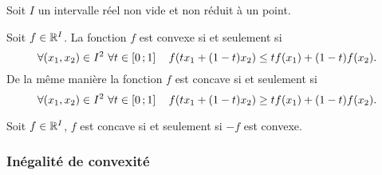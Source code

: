 Soit $I$ un intervalle réel non vide et non réduit à un point.

\begin{defdef}
  Soit $f \in \mathbb{R}^I$. La fonction $f$ est convexe si et seulement si
  \begin{equation}
    \forall (x_1, x_2) \in I^2 \ \forall t \in \left[ 0 \, ;  1 \right] \quad f(tx_1+(1-t)x_2) \leq tf(x_1)+(1-t)f(x_2).
  \end{equation}
  De la même manière la fonction $f$ est concave si et seulement si 
  \begin{equation}
    \forall (x_1, x_2) \in I^2 \ \forall t \in \left[ 0 \, ;  1 \right] \quad f(tx_1+(1-t)x_2) \geq tf(x_1)+(1-t)f(x_2).
  \end{equation}
\end{defdef}
\begin{prop}
  Soit $f \in \mathbb{R}^I$, $f$ est concave si et seulement si $-f$ est convexe.
\end{prop}

\subsubsection{Inégalité de convexité}

